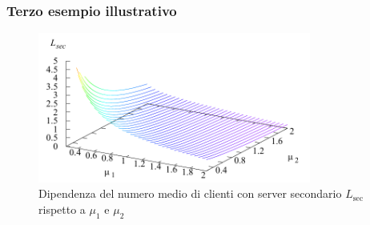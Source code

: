 \documentclass{beamer}
\begin{document}


\begin{frame}
    \frametitle{Terzo esempio illustrativo}
    \begin{figure}[h]
        \centering
        \includegraphics[width=0.8\textwidth]{R1VGHAR.png}
        \caption{Dipendenza del numero medio di clienti con server secondario $L_{\mathrm{sec}}$ rispetto a $\mu_1$ e $\mu_2$}
    \end{figure}
\end{frame}


\end{document}
